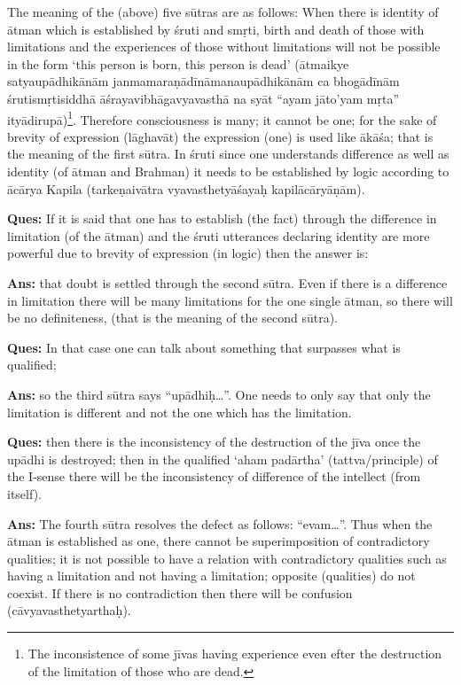 The meaning of the (above) five sūtras are as follows: When there is identity of ātman   which is established by śruti and smṛti, birth and death of those with limitations and the experiences of those without limitations will not be possible in the form ‘this person is born, this person is dead’ (ātmaikye satyaupādhikānām janmamaraṇādīnāmana\-upādhikānām ca bhogādīnām śrutismṛtisiddhā āśrayavibhāgavyava\-sthā na syāt “ayam jāto’yam mṛta” ityādirupā)\footnote{The inconsistence of some jīvas having experience even efter the destruction of the limitation of those who are dead.}. Therefore consciousness is many; it cannot be one; for the sake of brevity of expression (lāghavāt) the expression (one) is used like ākāśa; that is the meaning of the first sūtra. In śruti since one understands difference as well as identity (of ātman and Brahman) it needs to be established by logic according to ācārya Kapila (tarkeṇaivātra vyavasthetyāśayaḥ kapilācāryāṇām).

\textbf{Ques:} If it is said that one has to establish (the fact) through the difference in limitation (of the ātman) and the śruti utterances declaring identity are more powerful due to brevity of expression (in logic) then the answer is: 

\textbf{Ans:} that doubt is settled through the second sūtra. Even if there is a difference in limitation there will be many limitations for the one single ātman, so there will be no definiteness, (that is the meaning of the second sūtra).

\textbf{Ques:} In that case one can talk about something that surpasses what is qualified; 

\textbf{Ans:} so the third sūtra says “upādhiḥ…”. One needs to only say that only the limitation is different and not the one which has the limitation. 

\textbf{Ques:} then there is the inconsistency of the destruction of the jīva once the upādhi is destroyed; then in the qualified ‘aham padārtha’ (tattva/principle) of the I-sense there will be the inconsistency of difference of the intellect (from itself).

\textbf{Ans:} The fourth sūtra resolves the defect as follows: “evam…”. Thus when the ātman is established as one, there cannot be superimposition of contradictory qualities; it is not possible to have a relation with contradictory qualities such as having a limitation and not having a limitation; opposite (qualities) do not coexist. If there is no contradiction then there will be confusion (cāvyavasthetyarthaḥ).

